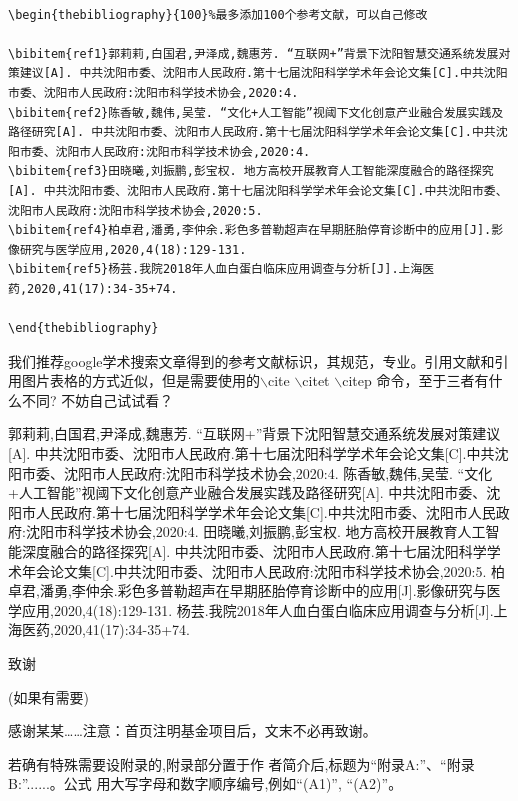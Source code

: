 \documentclass[a4paper, 10pt]{dselReport}
\begin{document}
\begin{lstlisting}

\begin{thebibliography}{100}%最多添加100个参考文献，可以自己修改

\bibitem{ref1}郭莉莉,白国君,尹泽成,魏惠芳. “互联网+”背景下沈阳智慧交通系统发展对策建议[A]. 中共沈阳市委、沈阳市人民政府.第十七届沈阳科学学术年会论文集[C].中共沈阳市委、沈阳市人民政府:沈阳市科学技术协会,2020:4.
\bibitem{ref2}陈香敏,魏伟,吴莹. “文化+人工智能”视阈下文化创意产业融合发展实践及路径研究[A]. 中共沈阳市委、沈阳市人民政府.第十七届沈阳科学学术年会论文集[C].中共沈阳市委、沈阳市人民政府:沈阳市科学技术协会,2020:4.
\bibitem{ref3}田晓曦,刘振鹏,彭宝权. 地方高校开展教育人工智能深度融合的路径探究[A]. 中共沈阳市委、沈阳市人民政府.第十七届沈阳科学学术年会论文集[C].中共沈阳市委、沈阳市人民政府:沈阳市科学技术协会,2020:5.
\bibitem{ref4}柏卓君,潘勇,李仲余.彩色多普勒超声在早期胚胎停育诊断中的应用[J].影像研究与医学应用,2020,4(18):129-131.
\bibitem{ref5}杨芸.我院2018年人血白蛋白临床应用调查与分析[J].上海医药,2020,41(17):34-35+74.

\end{thebibliography}

\end{lstlisting}

我们推荐google学术搜索文章得到的参考文献标识，其规范，专业。引用文献和引用图片表格的方式近似，但是需要使用的$\backslash$cite $\backslash$citet $\backslash$citep 命令，至于三者有什么不同? 不妨自己试试看？




\begin{thebibliography}{100}

郭莉莉,白国君,尹泽成,魏惠芳. “互联网+”背景下沈阳智慧交通系统发展对策建议[A]. 中共沈阳市委、沈阳市人民政府.第十七届沈阳科学学术年会论文集[C].中共沈阳市委、沈阳市人民政府:沈阳市科学技术协会,2020:4.
陈香敏,魏伟,吴莹. “文化+人工智能”视阈下文化创意产业融合发展实践及路径研究[A]. 中共沈阳市委、沈阳市人民政府.第十七届沈阳科学学术年会论文集[C].中共沈阳市委、沈阳市人民政府:沈阳市科学技术协会,2020:4.
田晓曦,刘振鹏,彭宝权. 地方高校开展教育人工智能深度融合的路径探究[A]. 中共沈阳市委、沈阳市人民政府.第十七届沈阳科学学术年会论文集[C].中共沈阳市委、沈阳市人民政府:沈阳市科学技术协会,2020:5.
柏卓君,潘勇,李仲余.彩色多普勒超声在早期胚胎停育诊断中的应用[J].影像研究与医学应用,2020,4(18):129-131.
杨芸.我院2018年人血白蛋白临床应用调查与分析[J].上海医药,2020,41(17):34-35+74.

\end{thebibliography}



\newpage
\vspace{1em}
{\hei\wuhao 致谢\quad}
{\fang\wuhao 
(如果有需要)

感谢某某……注意：首页注明基金项目后，文末不必再致谢。
}


\vskip 20pt
 
 
若确有特殊需要设附录的,附录部分置于作
者简介后,标题为“附录A:”、“附录B:”......。公式
用大写字母和数字顺序编号,例如“(A1)”, “(A2)”。
\end{document}
